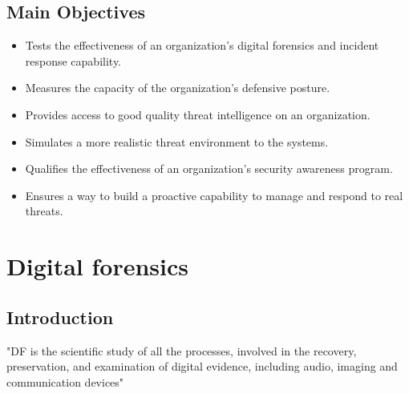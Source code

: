\subsection{Main Objectives}
\begin{itemize}
    \item Tests the effectiveness of an organization's digital forensics and incident response capability.
    \item Measures the capacity of the organization’s defensive posture.
    \item Provides access to good quality threat intelligence on an organization.
    \item Simulates a more realistic threat environment to the systems.
    \item Qualifies the effectiveness of an organization’s security awareness program.
    \item Ensures a way to build a proactive capability to manage and respond to real threats.
\end{itemize}

\section{Digital forensics}
\subsection{Introduction}
"DF is the scientific study of all the processes, involved in the recovery, preservation, and examination of digital evidence, including audio, imaging and communication devices" \cite{df}

